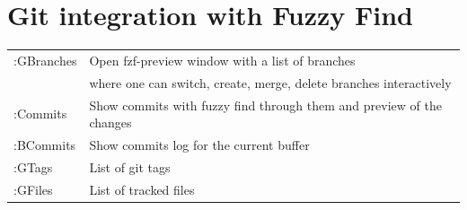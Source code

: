 \documentclass[aspectratio=169]{beamer}
\begin{document}
\section*{Git integration with Fuzzy Find}
\begin{frame}{\secname}

  \begin{tabular}{ll}
    :GBranches & Open fzf-preview window with a list of branches \\
               &   where one can switch, create, merge, delete branches interactively\\
    :Commits   & Show commits with fuzzy find through them and preview of the changes \\
    :BCommits  & Show commits log for the current buffer\\
    :GTags     & List of git tags \\
    :GFiles    & List of tracked files \\

  \end{tabular}
  	
\end{frame}

\end{document}
